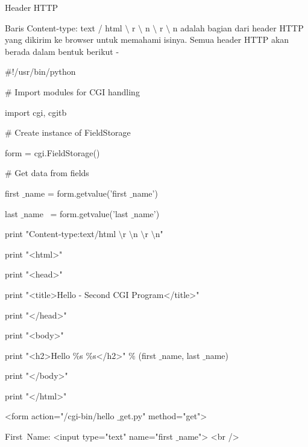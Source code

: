 \begin {enumerate}
\begin {enumerate}
\vspace{12pt}
\vspace{12pt}
\vspace{12pt}
\vspace{12pt}
\noindent
Header HTTP \par
\vspace{12pt}
\noindent
Baris Content-type: text / html  $  \setminus  $ r  $  \setminus  $ n  $  \setminus  $ r  $  \setminus  $ n adalah bagian dari header HTTP yang dikirim ke browser untuk memahami isinya. Semua header HTTP akan berada dalam bentuk berikut - \par
\noindent
 $  \#  $!/usr/bin/python \par
\vspace{12pt}
\noindent
 $  \#  $ Import modules for CGI handling  \par
\noindent
import cgi, cgitb  \par
\vspace{12pt}
\noindent
 $  \#  $ Create instance of FieldStorage  \par
\noindent
form = cgi.FieldStorage()  \par
\vspace{12pt}
\noindent
 $  \#  $ Get data from fields \par
\noindent
first $  \_  $name = form.getvalue('first $  \_  $name') \par
\noindent
last $  \_  $name~ = form.getvalue('last $  \_  $name') \par
\vspace{12pt}
\noindent
print "Content-type:text/html $  \setminus  $r $  \setminus  $n $  \setminus  $r $  \setminus  $n" \par
\noindent
print "<html>" \par
\noindent
print "<head>" \par
\noindent
print "<title>Hello - Second CGI Program</title>" \par
\noindent
print "</head>" \par
\noindent
print "<body>" \par
\noindent
print "<h2>Hello  $  \%  $s  $  \%  $s</h2>"  $  \%  $ (first $  \_  $name, last $  \_  $name) \par
\noindent
print "</body>" \par
\noindent
print "</html>" \par
\vspace{12pt}
\noindent
<form action="/cgi-bin/hello $  \_  $get.py" method="get"> \par
\noindent
First~Name: <input type="text" name="first $  \_  $name">  <br /> \par

\end{enumerate}
\end{enumerate}
